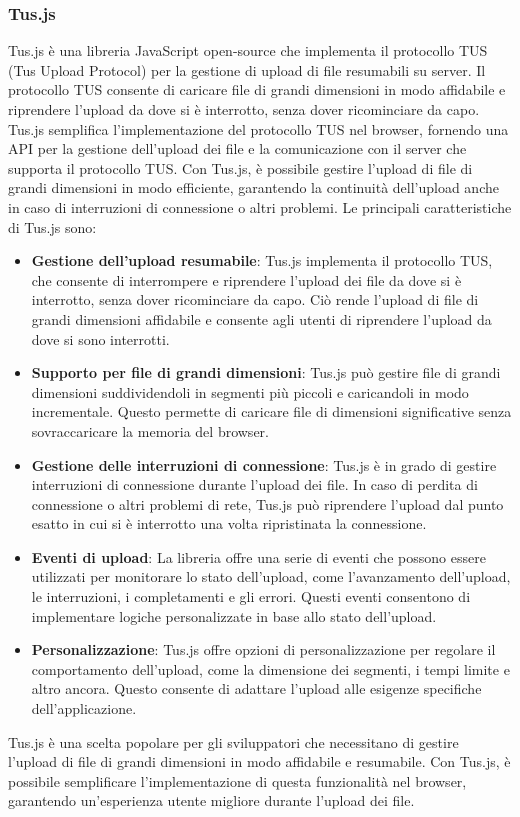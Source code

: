 \subsubsection{Tus.js}
Tus.js è una libreria JavaScript open-source che implementa il protocollo TUS (Tus Upload Protocol) per la gestione di upload di file resumabili su server. Il protocollo TUS consente di caricare file di grandi dimensioni in modo affidabile e riprendere l'upload da dove si è interrotto, senza dover ricominciare da capo.
Tus.js semplifica l'implementazione del protocollo TUS nel browser, fornendo una API per la gestione dell'upload dei file e la comunicazione con il server che supporta il protocollo TUS. Con Tus.js, è possibile gestire l'upload di file di grandi dimensioni in modo efficiente, garantendo la continuità dell'upload anche in caso di interruzioni di connessione o altri problemi.
Le principali caratteristiche di Tus.js sono:
\begin{itemize}
    \item \textbf{Gestione dell'upload resumabile}: Tus.js implementa il protocollo TUS, che consente di interrompere e riprendere l'upload dei file da dove si è interrotto, senza dover ricominciare da capo. Ciò rende l'upload di file di grandi dimensioni affidabile e consente agli utenti di riprendere l'upload da dove si sono interrotti.
  \item \textbf{Supporto per file di grandi dimensioni}: Tus.js può gestire file di grandi dimensioni suddividendoli in segmenti più piccoli e caricandoli in modo incrementale. Questo permette di caricare file di dimensioni significative senza sovraccaricare la memoria del browser.
  \item \textbf{Gestione delle interruzioni di connessione}: Tus.js è in grado di gestire interruzioni di connessione durante l'upload dei file. In caso di perdita di connessione o altri problemi di rete, Tus.js può riprendere l'upload dal punto esatto in cui si è interrotto una volta ripristinata la connessione.
  \item \textbf{Eventi di upload}: La libreria offre una serie di eventi che possono essere utilizzati per monitorare lo stato dell'upload, come l'avanzamento dell'upload, le interruzioni, i completamenti e gli errori. Questi eventi consentono di implementare logiche personalizzate in base allo stato dell'upload.
  \item \textbf{Personalizzazione}: Tus.js offre opzioni di personalizzazione per regolare il comportamento dell'upload, come la dimensione dei segmenti, i tempi limite e altro ancora. Questo consente di adattare l'upload alle esigenze specifiche dell'applicazione.
\end{itemize}
Tus.js è una scelta popolare per gli sviluppatori che necessitano di gestire l'upload di file di grandi dimensioni in modo affidabile e resumabile. Con Tus.js, è possibile semplificare l'implementazione di questa funzionalità nel browser, garantendo un'esperienza utente migliore durante l'upload dei file.
